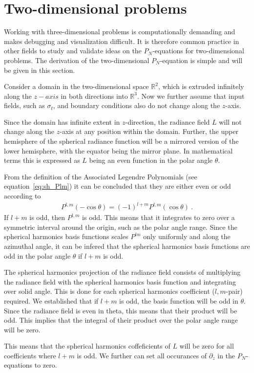 \section{Two-dimensional problems}
\label{sec:pn_2d}

Working with three-dimensional problems is computationally demanding and makes debugging and visualization difficult. It is therefore common practice in other fields to study and validate ideas on the $P_N$-equations for two-dimensional problems. The derivation of the two-dimensional $P_N$-equation is simple and will be given in this section.

Consider a domain in the two-dimensional space $\mathbb{R}^2$, which is extruded infinitely along the $z-axis$ in both directions into $\mathbb{R}^3$. Now we further assume that input fields, such as $\sigma_t$, and boundary conditions also do not change along the $z$-axis.

Since the domain has infinite extent in $z$-direction, the radiance field $L$ will not change along the $z$-axis at any position within the domain. Further, the upper hemisphere of the spherical radiance function will be a mirrored version of the lower hemisphere, with the equator being the mirror plane. In mathematical terms this is expressed as $L$ being an even function in the polar angle $\theta$.

From the definition of the Associated Legendre Polynomials (see equation~\ref{eq:sh_Plm}) it can be concluded that they are either even or odd according to
\begin{align}
P^{l,m}\left(-\operatorname{cos}\theta\right) = 
\left(-1\right)^{l+m}
P^{l,m}\left(\operatorname{cos}\theta\right)
\ .
\end{align}
If $l+m$ is odd, then $P^{l,m}$ is odd. This means that it integrates to zero over a symmetric interval around the origin, such as the polar angle range. Since the spherical harmonics basis functions scales $P^{lm}$ only uniformly and along the azimuthal angle, it can be infered that the spherical harmonics basis functions are odd in the polar angle $\theta$ if $l+m$ is odd.

The spherical harmonics projection of the radiance field consists of multiplying the radiance field with the spherical harmonics basis function and integrating over solid angle. This is done for each spherical harmonics coefficient ($l,m$-pair) required. We established that if $l+m$ is odd, the basis function will be odd in $\theta$. Since the radiance field is even in theta, this means that their product will be odd. This implies that the integral of their product over the polar angle range will be zero.

This means that the spherical harmonics coffeficients of $L$ will be zero for all coefficients where $l+m$ is odd. We further can set all occurances of $\partial_z$ in the $P_N$-equations to zero.

